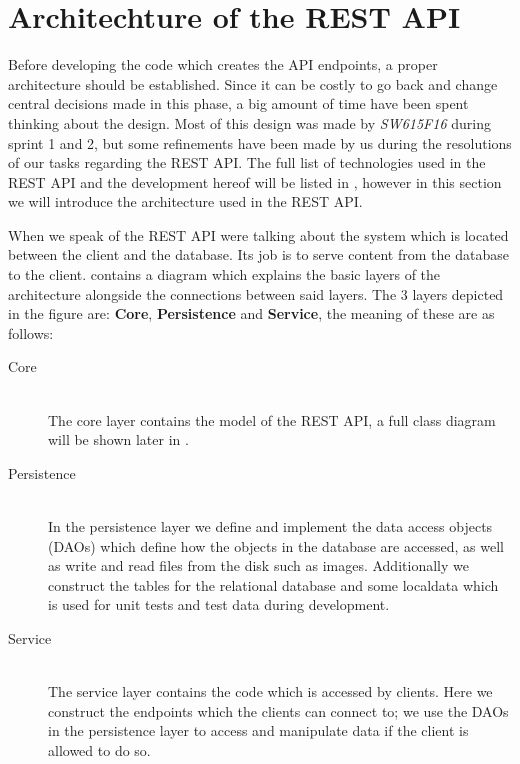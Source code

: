 \section{Architechture of the REST API}\label{architechture}
Before developing the code which creates the API endpoints, a proper architecture should be established.
Since it can be costly to go back and change central decisions made in this phase, a big amount of time have been spent thinking about the design.
Most of this design was made by \textit{SW615F16} during sprint 1 and 2, but some refinements have been made by us during the resolutions of our tasks regarding the REST API.
The full list of technologies used in the REST API and the development hereof will be listed in , however in this section we will introduce the architecture used in the REST API.



When we speak of the REST API were talking about the system which is located between the client and the database.
Its job is to serve content from the database to the client.
 contains a diagram which explains the basic layers of the architecture alongside the connections between said layers.
The 3 layers depicted in the figure are: \textbf{Core}, \textbf{Persistence} and \textbf{Service}, the meaning of these are as follows:
\begin{description}
    \item[Core] \hfill \\
    The core layer contains the model of the REST API, a full class diagram will be shown later in .

    \item[Persistence] \hfill \\
    In the persistence layer we define and implement the data access objects (DAOs) which define how the objects in the database are accessed, as well as write and read files from the disk such as images.
    Additionally we construct the tables for the relational database and some localdata which is used for unit tests and test data during development.

    \item[Service] \hfill \\
    The service layer contains the code which is accessed by clients.
    Here we construct the endpoints which the clients can connect to; we use the DAOs in the persistence layer to access and manipulate data if the client is allowed to do so.
\end{description}

